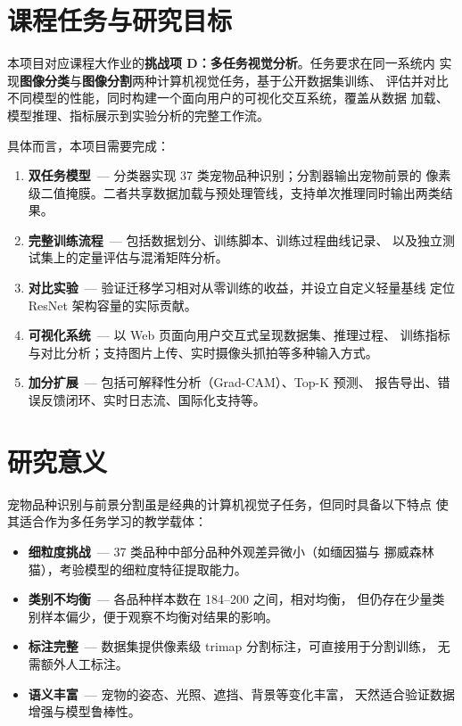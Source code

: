 \documentclass[12pt, a4paper, openany]{ctexbook}
\begin{document}
\section{课程任务与研究目标}

本项目对应课程大作业的\textbf{挑战项 D：多任务视觉分析}。任务要求在同一系统内
实现\textbf{图像分类}与\textbf{图像分割}两种计算机视觉任务，基于公开数据集训练、
评估并对比不同模型的性能，同时构建一个面向用户的可视化交互系统，覆盖从数据
加载、模型推理、指标展示到实验分析的完整工作流。

具体而言，本项目需要完成：

\begin{enumerate}[leftmargin=*]
  \item \textbf{双任务模型}\ — 分类器实现 37 类宠物品种识别；分割器输出宠物前景的
        像素级二值掩膜。二者共享数据加载与预处理管线，支持单次推理同时输出两类结果。
  \item \textbf{完整训练流程}\ — 包括数据划分、训练脚本、训练过程曲线记录、
        以及独立测试集上的定量评估与混淆矩阵分析。
  \item \textbf{对比实验}\ — 验证迁移学习相对从零训练的收益，并设立自定义轻量基线
        定位 ResNet 架构容量的实际贡献。
  \item \textbf{可视化系统}\ — 以 Web 页面向用户交互式呈现数据集、推理过程、
        训练指标与对比分析；支持图片上传、实时摄像头抓拍等多种输入方式。
  \item \textbf{加分扩展}\ — 包括可解释性分析（Grad-CAM）、Top-K 预测、
        报告导出、错误反馈闭环、实时日志流、国际化支持等。
\end{enumerate}

\section{研究意义}

宠物品种识别与前景分割虽是经典的计算机视觉子任务，但同时具备以下特点
使其适合作为多任务学习的教学载体：

\begin{itemize}[leftmargin=*]
  \item \textbf{细粒度挑战}\ — 37 类品种中部分品种外观差异微小（如缅因猫与
        挪威森林猫），考验模型的细粒度特征提取能力。
  \item \textbf{类别不均衡}\ — 各品种样本数在 184--200 之间，相对均衡，
        但仍存在少量类别样本偏少，便于观察不均衡对结果的影响。
  \item \textbf{标注完整}\ — 数据集提供像素级 trimap 分割标注，可直接用于分割训练，
        无需额外人工标注。
  \item \textbf{语义丰富}\ — 宠物的姿态、光照、遮挡、背景等变化丰富，
        天然适合验证数据增强与模型鲁棒性。
\end{itemize}
\end{document}
